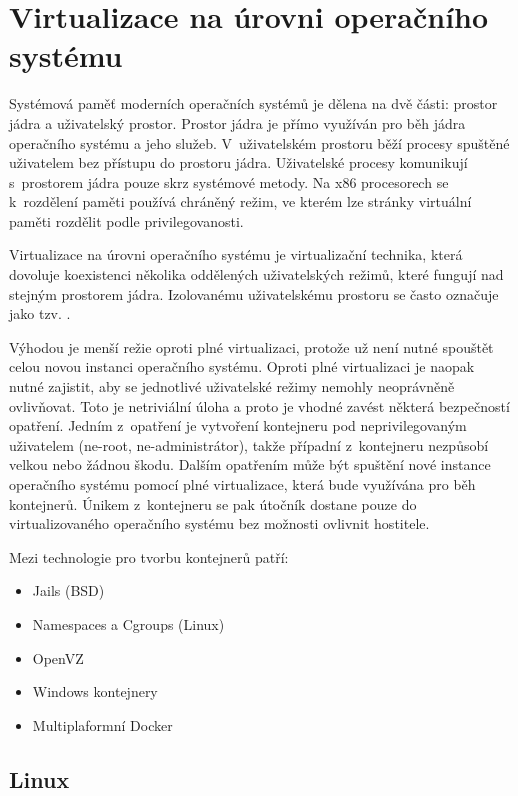 \section{Virtualizace na úrovni operačního systému}

Systémová paměť moderních operačních systémů je dělena na dvě části: prostor jádra a uživatelský prostor.
Prostor jádra je přímo využíván pro běh jádra operačního systému a jeho služeb.
V~uživatelském prostoru běží procesy spuštěné uživatelem bez přístupu do prostoru jádra.
Uživatelské procesy komunikují s~prostorem jádra pouze skrz systémové metody.
Na x86 procesorech se k~rozdělení paměti používá chráněný režim, ve kterém lze stránky virtuální paměti rozdělit podle privilegovanosti.

Virtualizace na úrovni operačního systému je virtualizační technika, která dovoluje koexistenci několika oddělených uživatelských režimů, které fungují nad stejným prostorem jádra.
Izolovanému uživatelskému prostoru se často označuje jako tzv. .

Výhodou je menší režie oproti plné virtualizaci, protože už není nutné spouštět celou novou instanci operačního systému.
Oproti plné virtualizaci je naopak nutné zajistit, aby se jednotlivé uživatelské režimy nemohly neoprávněně ovlivňovat.
Toto je netriviální úloha a proto je vhodné zavést některá bezpečností opatření.
Jedním z~opatření je vytvoření kontejneru pod neprivilegovaným uživatelem (ne-root, ne-administrátor), takže případní  z~kontejneru nezpůsobí velkou nebo žádnou škodu.
Dalším opatřením může být spuštění nové instance operačního systému pomocí plné virtualizace, která bude využívána pro běh kontejnerů.
Únikem z~kontejneru se pak útočník dostane pouze do virtualizovaného operačního systému bez možnosti ovlivnit hostitele.

{
Mezi technologie pro tvorbu kontejnerů patří:

\begin{itemize}
	\item Jails (BSD)
	\item Namespaces a Cgroups (Linux)
	\item OpenVZ
	\item Windows kontejnery
	\item Multiplaformní Docker
\end{itemize}
}

\subsection{Linux}

